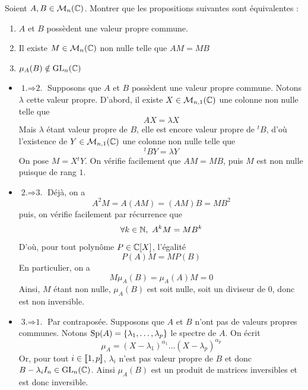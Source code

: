 \begin{exo}
	\label{reduction1}
	Soient $A,B\in\mathcal M_n(\operatorname{\mathbb C})$. Montrer que les propositions suivantes sont équivalentes :
	\begin{enumerate}
		\item $A$ et $B$ possèdent une valeur propre commune.
		\item Il existe $M\in\mathcal M_n(\operatorname{\mathbb C})$ non nulle telle que $AM=MB$
		\item $\mu_A(B)\notin \operatorname{GL}_n(\operatorname{\mathbb C})$
	\end{enumerate}
\end{exo}

\begin{solution}
    \begin{itemize}
        \item[]$\boxed{\text{1.} \Rightarrow \text{2.}}$\quad
        Supposons que $A$ et $B$ possèdent une valeur propre commune. Notons $\lambda$ cette valeur propre.
        D'abord, il existe $X\in\mathcal M_{n,1}(\operatorname{\mathbb C})$ une colonne non nulle telle que
        \[AX=\lambda X\]
        Mais $\lambda$ étant valeur propre de $B$, elle est encore valeur propre de ${}^tB$, d'où l'existence de $Y\in\mathcal M_{n,1}(\operatorname{\mathbb C})$ une colonne non nulle telle que
        \[{}^tBY=\lambda Y\]
        On pose $M=X{}^tY$. On vérifie facilement que $AM=MB$, puis $M$ est non nulle puisque de rang $1$.
        
        \item[]$\boxed{\text{2.} \Rightarrow \text{3.}}$\quad
        Déjà, on a 
        \[A^2M=A(AM)=(AM)B=MB^2\]
        puis, on vérifie facilement par récurrence que 
        \[\forall k\in\operatorname{\mathbb N},\ A^kM=MB^k\]
        D'où, pour tout polynôme $P\in\operatorname{\mathbb C}[X]$, l'égalité
        \[P(A)M=MP(B)\]
        En particulier, on a 
        \[M\mu_A(B)=\mu_A(A)M=0\]
        Ainsi, $M$ étant non nulle, $\mu_A(B)$ est soit nulle, soit un diviseur de $0$, donc est non inversible.
        
        \item[]$\boxed{\text{3.} \Rightarrow \text{1.}}$\quad
        Par contraposée. Supposons que $A$ et $B$ n'ont pas de valeurs propres communes.
        Notons $\operatorname{Sp}(A)=\lbrace \lambda_1,\dots,\lambda_p\rbrace$ le spectre de $A$. On écrit
        \[\mu_A=(X-\lambda_1)^{\alpha_1}\dots(X-\lambda_p)^{\alpha_p}\]
        Or, pour tout $i\in[\![1,p]\!]$, $\lambda_i$ n'est pas valeur propre de $B$ et donc $B-\lambda_iI_n\in \operatorname{GL}_n(\operatorname{\mathbb C})$. Ainsi $\mu_A(B)$ est un produit de matrices inversibles et est donc inversible.
    \end{itemize}
\end{solution}

